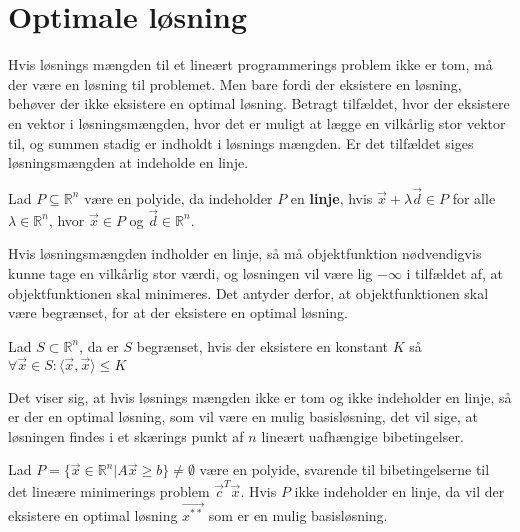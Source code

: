 \section{Optimale løsning}
\label{sec:eksistens}
Hvis løsnings mængden til et lineært programmerings problem ikke er tom, må der være en løsning til problemet.
Men bare fordi der eksistere en løsning, behøver der ikke eksistere en optimal løsning. 
Betragt tilfældet, hvor der eksistere en vektor i løsningsmængden, hvor det er muligt at lægge en vilkårlig stor vektor til, og summen stadig er indholdt i løsnings mængden.
Er det tilfældet siges løsningsmængden at indeholde en linje.
\begin{defn}[Linje]
Lad $P\subseteq \mathds{R}^n $ være en polyide, da indeholder $P$ en \textbf{linje}, hvis $\vec{x}+\lambda\vec{d} \in P$ for alle $\lambda \in \mathds{R}^n$, hvor $\vec{x}\in P$ og $\vec{d} \in \mathds{R}^n$.
\end{defn}
Hvis løsningsmængden indholder en linje, så må objektfunktion nødvendigvis kunne tage en vilkårlig stor værdi, og løsningen vil være lig $-\infty$ i tilfældet af, at objektfunktionen skal minimeres. 
Det antyder derfor, at objektfunktionen skal være begrænset, for at der eksistere en optimal løsning.
\begin{defn} [Begrænset]
Lad $S \subset \mathds{R}^n$, da er $S$ begrænset, hvis der eksistere en konstant $K$ så $\forall \vec{x} \in S: \langle \vec{x}, \vec{x} \rangle \leq K$
\end{defn}
Det viser sig, at hvis løsnings mængden ikke er tom og ikke indeholder en linje, så er der en optimal løsning, som vil være en mulig basisløsning, det vil sige, at løsningen findes i et skærings punkt af $n$ lineært uafhængige bibetingelser.
\begin{stn}
Lad $P=\{\vec{x} \in \mathds{R}^n| A \vec{x} \geq b \} \neq \emptyset$ være en polyide, svarende til bibetingelserne til det lineære minimerings problem $\vec{c}^T\vec{x}$. Hvis $P$ ikke indeholder en linje, da vil der eksistere en optimal løsning $\vec{x^{**}}$ som er en mulig basisløsning.
\label{stn:eksistens}
\end{stn}

